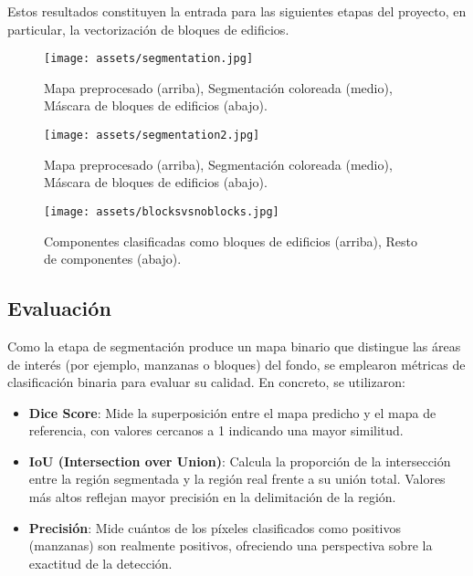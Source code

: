 \documentclass[twocolumn, fontsize=10pt]{article}
\begin{document}
Estos resultados constituyen la entrada para las siguientes etapas del proyecto, en particular, la vectorización de bloques de edificios.

\begin{figure}[H]
    \centering
    \texttt{[image: assets/segmentation.jpg]}
    \caption{Mapa preprocesado (arriba), Segmentación coloreada (medio), Máscara de bloques de edificios (abajo).}
    \label{fig:segmentation}
\end{figure}

\begin{figure}[H]
    \centering
    \texttt{[image: assets/segmentation2.jpg]}
    \caption{Mapa preprocesado (arriba), Segmentación coloreada (medio), Máscara de bloques de edificios (abajo).}
    \label{fig:segmentation2}
\end{figure}

\begin{figure}[H]
    \centering
    \texttt{[image: assets/blocksvsnoblocks.jpg]}
    \caption{Componentes clasificadas como bloques de edificios (arriba), Resto de componentes (abajo).}
    \label{fig:blocksvsnoblocks}
\end{figure}

\subsection{Evaluación}

Como la etapa de segmentaci\'on produce un mapa binario que distingue las \'areas de inter\'es (por ejemplo, manzanas o bloques) del fondo, se emplearon m\'etricas de clasificaci\'on 
binaria para evaluar su calidad. 
En concreto, se utilizaron:

\begin{itemize}
    \item \textbf{Dice Score}: \cite{dice} Mide la superposici\'on entre el mapa predicho y el mapa de referencia, con valores cercanos a 1 indicando una mayor similitud.
    \item \textbf{IoU (Intersection over Union)}: \cite{iou} Calcula la proporci\'on de la intersecci\'on entre la regi\'on segmentada y la regi\'on real frente a su uni\'on total. Valores m\'as altos reflejan mayor precisi\'on en la delimitaci\'on de la regi\'on.
    \item \textbf{Precisi\'on}: Mide cu\'antos de los p\'ixeles clasificados como positivos (manzanas) son realmente positivos, ofreciendo una perspectiva sobre la exactitud de la detecci\'on.
\end{itemize}
\end{document}

